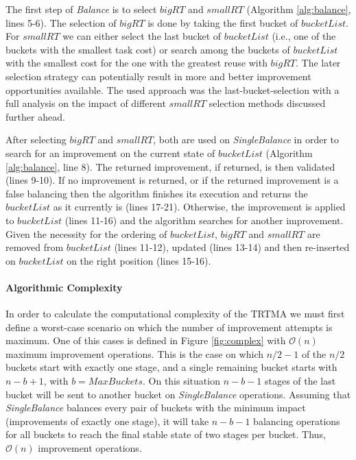 The first step of {\em Balance} is to select $bigRT$ and $smallRT$ (Algorithm \ref{alg:balance}, lines 5-6). The selection of $bigRT$ is done by taking the first bucket of $bucketList$. For $smallRT$ we can either select the last bucket of $bucketList$ (i.e., one of the buckets with the smallest task cost) or search among the buckets of $bucketList$ with the smallest cost for the one with the greatest reuse with $bigRT$. The later selection strategy can potentially result in more and better improvement opportunities available. The used approach was the last-bucket-selection with a full analysis on the impact of different $smallRT$ selection methods discussed further ahead.

After selecting $bigRT$ and $smallRT$, both are used on {\em SingleBalance} in order to search for an improvement on the current state of $bucketList$ (Algorithm \ref{alg:balance}, line 8). The returned improvement, if returned, is then validated (lines 9-10). If no improvement is returned, or if the returned improvement is a false balancing then the algorithm finishes its execution and returns the $bucketList$ as it currently is (lines 17-21). Otherwise, the improvement is applied to $bucketList$ (lines 11-16) and the algorithm searches for another improvement. Given the necessity for the ordering of $bucketList$, $bigRT$ and $smallRT$ are removed from $bucketList$ (lines 11-12), updated (lines 13-14) and then re-inserted on $bucketList$ on the right position (lines 15-16).

\paragraph{Algorithmic Complexity}

In order to calculate the computational complexity of the TRTMA we must first define a worst-case scenario on which the number of improvement attempts is maximum. One of this cases is defined in Figure \ref{fig:complex} with $\mathcal{O}(n)$ maximum improvement operations. This is the case on which $n/2-1$ of the $n/2$ buckets start with exactly one stage, and a single remaining bucket starts with $n-b+1$, with $b=MaxBuckets$. On this situation $n-b-1$ stages of the last bucket will be sent to another bucket on {\em SingleBalance} operations. Assuming that {\em SingleBalance} balances every pair of buckets with the minimum impact (improvements of exactly one stage), it will take $n-b-1$ balancing operations for all buckets to reach the final stable state of two stages per bucket. Thus, $\mathcal{O}(n)$ improvement operations.


